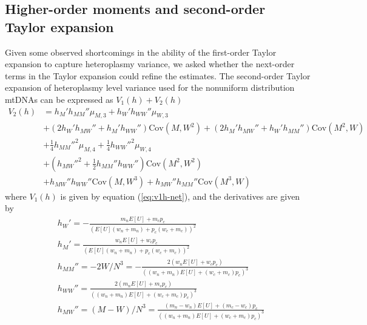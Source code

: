 \documentclass{article}
\begin{document}
\begin{appendices}
\subsection{Higher-order moments and second-order Taylor expansion}\label{app:v2h-gen-moments}
Given some observed shortcomings in the ability of the first-order Taylor expansion to capture heteroplasmy variance, we asked whether the next-order terms in the Taylor expansion could refine the estimates. The second-order Taylor expansion of heteroplasmy level variance used for the nonuniform distribution mtDNAs can be expressed as $V_1(h)+V_2(h)$
\begin{equation}\label{eq:app-v2h-net}
    \begin{split}
        V_2(h) & =  h_M'h_{MM}''\mu_{M,3} + h_W'h_{WW}''\mu_{W,3}\\
       & + (2h_W'h_{MW}''+h_M'h_{WW}'')\mathrm{Cov}(M,W^2) + (2h_M'h_{MW}''+h_W'h_{MM}'')\mathrm{Cov}(M^2,W)\\
       & + \frac{1}{4}h_{MM}''^2\mu_{M,4}
         +\frac{1}{4}h_{WW}''^2\mu_{W,4}\\
       & + (h_{MW}''^2+\frac{1}{2}h_{MM}''h_{WW}'')\mathrm{Cov}(M^2,W^2)\\
       & + h_{MW}''h_{WW}''\mathrm{Cov}(M,W^3)+h_{MW}''h_{MM}''\mathrm{Cov}(M^3,W)
    \end{split}
\end{equation}
where $V_1(h)$ is given by equation (\ref{eq:v1h-net}), and the derivatives are given by
\begin{equation*}
    \begin{split}
        & h_W' =-\frac{m_nE[U]+m_cp_c}{(E[U](w_n+m_n)+p_c(w_c+m_c))^2}\\
        & h_M' = \frac{w_nE[U]+w_cp_c}{(E[U](w_n+m_n)+p_c(w_c+m_c))^2}\\
        & h_{MM}'' = -2W/N^3=-\frac{2(w_nE[U]+w_cp_c)}{((w_n+m_n)E[U]+(w_c+m_c)p_c)^3}\\
        & h_{WW}'' = \frac{2(m_nE[U]+m_cp_c)}{((w_n+m_n)E[U]+(w_c+m_c)p_c)^3}\\
        & h_{MW}'' = (M-W)/N^3=\frac{(m_n-w_n)E[U]+(m_c-w_c)p_c}{((w_n+m_n)E[U]+(w_c+m_c)p_c)^3}
    \end{split}
\end{equation*}


\end{appendices}
\end{document}
